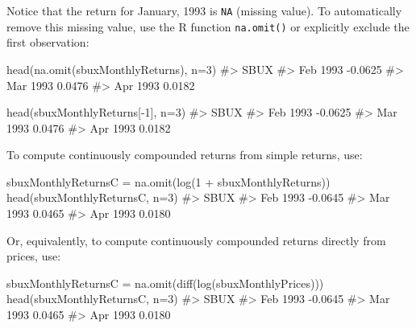 \documentclass[
  letterpaper,
  DIV=11,
  numbers=noendperiod]{scrreprt}
\newenvironment{Shaded}{\begin{snugshade}}{\end{snugshade}}
\newcommand{\AttributeTok}[1]{\textcolor[rgb]{0.40,0.45,0.13}{#1}}
\newcommand{\CommentTok}[1]{\textcolor[rgb]{0.37,0.37,0.37}{#1}}
\newcommand{\DecValTok}[1]{\textcolor[rgb]{0.68,0.00,0.00}{#1}}
\newcommand{\FunctionTok}[1]{\textcolor[rgb]{0.28,0.35,0.67}{#1}}
\newcommand{\NormalTok}[1]{\textcolor[rgb]{0.00,0.23,0.31}{#1}}
\newcommand{\OtherTok}[1]{\textcolor[rgb]{0.00,0.23,0.31}{#1}}
\newcommand{\SpecialCharTok}[1]{\textcolor[rgb]{0.37,0.37,0.37}{#1}}
\theoremstyle{definition}
\theoremstyle{definition}
\theoremstyle{remark}
\begin{document}
Notice that the return for January, 1993 is \texttt{NA} (missing value).
To automatically remove this missing value, use the R function
\texttt{na.omit()} or explicitly exclude the first observation:

\begin{Shaded}
\begin{Highlighting}[]
\FunctionTok{head}\NormalTok{(}\FunctionTok{na.omit}\NormalTok{(sbuxMonthlyReturns), }\AttributeTok{n=}\DecValTok{3}\NormalTok{)}
\CommentTok{\#\textgreater{}             SBUX}
\CommentTok{\#\textgreater{} Feb 1993 {-}0.0625}
\CommentTok{\#\textgreater{} Mar 1993  0.0476}
\CommentTok{\#\textgreater{} Apr 1993  0.0182}
\end{Highlighting}
\end{Shaded}

\begin{Shaded}
\begin{Highlighting}[]
\FunctionTok{head}\NormalTok{(sbuxMonthlyReturns[}\SpecialCharTok{{-}}\DecValTok{1}\NormalTok{], }\AttributeTok{n=}\DecValTok{3}\NormalTok{)}
\CommentTok{\#\textgreater{}             SBUX}
\CommentTok{\#\textgreater{} Feb 1993 {-}0.0625}
\CommentTok{\#\textgreater{} Mar 1993  0.0476}
\CommentTok{\#\textgreater{} Apr 1993  0.0182}
\end{Highlighting}
\end{Shaded}

To compute continuously compounded returns from simple returns, use:

\begin{Shaded}
\begin{Highlighting}[]
\NormalTok{sbuxMonthlyReturnsC }\OtherTok{=} \FunctionTok{na.omit}\NormalTok{(}\FunctionTok{log}\NormalTok{(}\DecValTok{1} \SpecialCharTok{+}\NormalTok{ sbuxMonthlyReturns))}
\FunctionTok{head}\NormalTok{(sbuxMonthlyReturnsC, }\AttributeTok{n=}\DecValTok{3}\NormalTok{)}
\CommentTok{\#\textgreater{}             SBUX}
\CommentTok{\#\textgreater{} Feb 1993 {-}0.0645}
\CommentTok{\#\textgreater{} Mar 1993  0.0465}
\CommentTok{\#\textgreater{} Apr 1993  0.0180}
\end{Highlighting}
\end{Shaded}

Or, equivalently, to compute continuously compounded returns directly
from prices, use:

\begin{Shaded}
\begin{Highlighting}[]
\NormalTok{sbuxMonthlyReturnsC }\OtherTok{=} \FunctionTok{na.omit}\NormalTok{(}\FunctionTok{diff}\NormalTok{(}\FunctionTok{log}\NormalTok{(sbuxMonthlyPrices))) }
\FunctionTok{head}\NormalTok{(sbuxMonthlyReturnsC, }\AttributeTok{n=}\DecValTok{3}\NormalTok{)}
\CommentTok{\#\textgreater{}             SBUX}
\CommentTok{\#\textgreater{} Feb 1993 {-}0.0645}
\CommentTok{\#\textgreater{} Mar 1993  0.0465}
\CommentTok{\#\textgreater{} Apr 1993  0.0180}
\end{Highlighting}
\end{Shaded}
\end{document}
